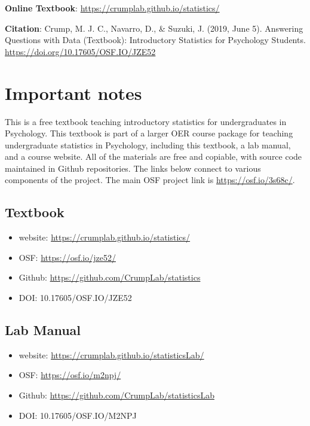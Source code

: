 \documentclass[]{book}
\providecommand{\tightlist}{%
  \setlength{\itemsep}{0pt}\setlength{\parskip}{0pt}}
\begin{document}
\textbf{Online Textbook}: \url{https://crumplab.github.io/statistics/}

\textbf{Citation}: Crump, M. J. C., Navarro, D., \& Suzuki, J. (2019, June 5). Answering Questions with Data (Textbook): Introductory Statistics for Psychology Students. \url{https://doi.org/10.17605/OSF.IO/JZE52}

\hypertarget{important-notes}{%
\section{Important notes}\label{important-notes}}

This is a free textbook teaching introductory statistics for undergraduates in Psychology. This textbook is part of a larger OER course package for teaching undergraduate statistics in Psychology, including this textbook, a lab manual, and a course website. All of the materials are free and copiable, with source code maintained in Github repositories. The links below connect to various components of the project. The main OSF project link is \url{https://osf.io/3s68c/}.

\hypertarget{textbook}{%
\subsection{Textbook}\label{textbook}}

\begin{itemize}
\tightlist
\item
  website: \url{https://crumplab.github.io/statistics/}
\item
  OSF: \url{https://osf.io/jze52/}
\item
  Github: \url{https://github.com/CrumpLab/statistics}
\item
  DOI: 10.17605/OSF.IO/JZE52
\end{itemize}

\hypertarget{lab-manual}{%
\subsection{Lab Manual}\label{lab-manual}}

\begin{itemize}
\tightlist
\item
  website: \url{https://crumplab.github.io/statisticsLab/}
\item
  OSF: \url{https://osf.io/m2npj/}
\item
  Github: \url{https://github.com/CrumpLab/statisticsLab}
\item
  DOI: 10.17605/OSF.IO/M2NPJ
\end{itemize}
\end{document}
